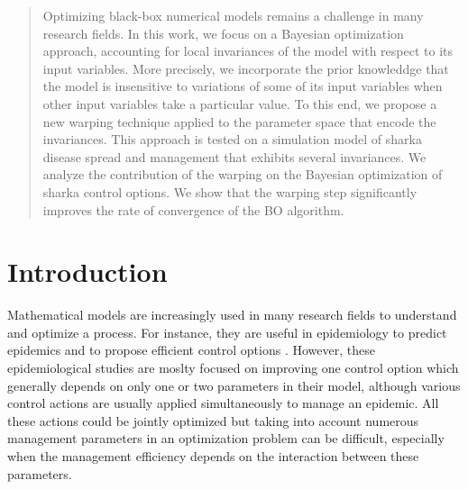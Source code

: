 \begin{abstract}
Optimizing black-box numerical models remains a challenge in many research fields. 
In this work, we focus on a Bayesian optimization approach, accounting for local invariances of the model with respect to its input variables.
More precisely, we incorporate the prior knowleddge that the model is insensitive to variations of some of its input variables 
when other input variables take a particular value. To this end, we propose a new warping technique applied to the parameter space
that encode the invariances. 
This approach is tested on a simulation model of sharka disease spread and management that exhibits several invariances. 
We analyze the contribution of the warping on the Bayesian optimization of sharka control options. 
We show that the warping step significantly improves the rate of convergence of the BO algorithm.
% 
\end{abstract}

\section{Introduction}

Mathematical models are increasingly used in many research fields to understand and optimize a process. For instance, 
they are useful in epidemiology to predict epidemics and to propose efficient control options 
\cite{cunniffe2015thirteen,cunniffe2016modeling,mushayabasa2015modeling,tildesley2006optimal,bajardi2012optimizing,kompas2017optimal,vanderwaal2017optimal,grechi2012designing}.
However, these epidemiological studies are moslty focused on improving one control option which generally depends on only one or two parameters in their model, 
although various control actions are usually applied simultaneously to manage an epidemic. All these actions could be jointly optimized but taking into account numerous management parameters in an optimization problem can be difficult,
especially when the management efficiency depends on the interaction between these parameters.

